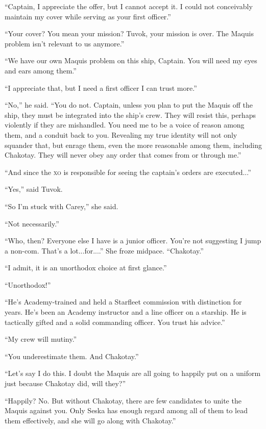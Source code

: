 \documentclass[twoside,letterpaper,12pt]{memoir}
\begin{document}
``Captain, I appreciate the offer, but I cannot accept it. I could not conceivably maintain my cover while serving as your first officer.” 

``Your cover? You mean your mission? Tuvok, your mission is over. The Maquis problem isn’t relevant to us anymore.” 

``We have our own Maquis problem on this ship, Captain. You will need my eyes and ears among them.” 

``I appreciate that, but I need a first officer I can trust more.” 

``No,” he said. ``You do not. Captain, unless you plan to put the Maquis off the ship, they must be integrated into the ship’s crew. They will resist this, perhaps violently if they are mishandled. You need me to be a voice of reason among them, and a conduit back to you. Revealing my true identity will not only squander that, but enrage them, even the more reasonable among them, including Chakotay. They will never obey any order that comes from or through me.” 

``And since the \textsc{xo} is responsible for seeing the captain’s orders are executed...” 

``Yes,” said Tuvok. 

``So I’m stuck with Carey,” she said. 

``Not necessarily.” 

``Who, then? Everyone else I have is a junior officer. You’re not suggesting I jump a non-com. That’s a lot...for....” She froze midpace. ``Chakotay.” 

``I admit, it is an unorthodox choice at first glance.” 

``Unorthodox!” 

``He’s Academy-trained and held a Starfleet commission with distinction for years. He’s been an Academy instructor and a line officer on a starship. He is tactically gifted and a solid commanding officer. You trust his advice.” 

``My crew will mutiny.” 

``You underestimate them. And Chakotay.” 

``Let’s say I do this. I doubt the Maquis are all going to happily put on a uniform just because Chakotay did, will they?” 

``Happily? No. But without Chakotay, there are few candidates to unite the Maquis against you. Only Seska has enough regard among all of them to lead them effectively, and she will go along with Chakotay.” 
\end{document}
